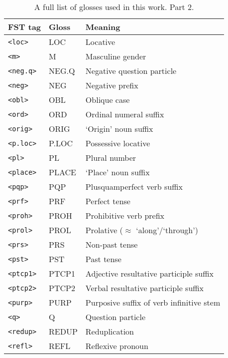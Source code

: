 \begin{table}[!h]
    \begin{center}
        \caption{A full list of glosses used in this work. Part 2.}
        \label{Tab:glosses_2}
        \begin{tabular}{|p{4cm}|p{3cm}|p{8.5cm}|}
            \hline
            \textbf{FST tag} & \textbf{Gloss} & \textbf{Meaning} \\
            \hline
            \hline
            \texttt{<loc>} & LOC & Locative\\
            \texttt{<m>} & M & Masculine gender\\
            \texttt{<neg.q>} & NEG.Q & Negative question particle\\
            \texttt{<neg>} & NEG & Negative prefix\\
            \texttt{<obl>} & OBL & Oblique case\\
            \texttt{<ord>} & ORD & Ordinal numeral suffix\\
            \texttt{<orig>} & ORIG & `Origin' noun suffix\\
            \texttt{<p.loc>} & P.LOC & Possessive locative\\
            \texttt{<pl>} & PL & Plural number\\
            \texttt{<place>} & PLACE & `Place' noun suffix\\
            \texttt{<pqp>} & PQP & Plusquamperfect verb suffix\\
            \texttt{<prf>} & PRF & Perfect tense\\
            \texttt{<proh>} & PROH & Prohibitive verb prefix\\
            \texttt{<prol>} & PROL & Prolative ($\approx$ `along'/`through')\\
            \texttt{<prs>} & PRS & Non-past tense\\
            \texttt{<pst>} & PST & Past tense\\
            \texttt{<ptcp1>} & PTCP1 & Adjective resultative participle suffix\\
            \texttt{<ptcp2>} & PTCP2 & Verbal resultative participle suffix\\
            \texttt{<purp>} & PURP & Purposive suffix of verb infinitive stem\\
            \texttt{<q>} & Q & Question particle\\
            \texttt{<redup>} & REDUP & Reduplication\\
            \texttt{<refl>} & REFL & Reflexive pronoun\\

\end{tabular}
\end{center}
\end{table}
